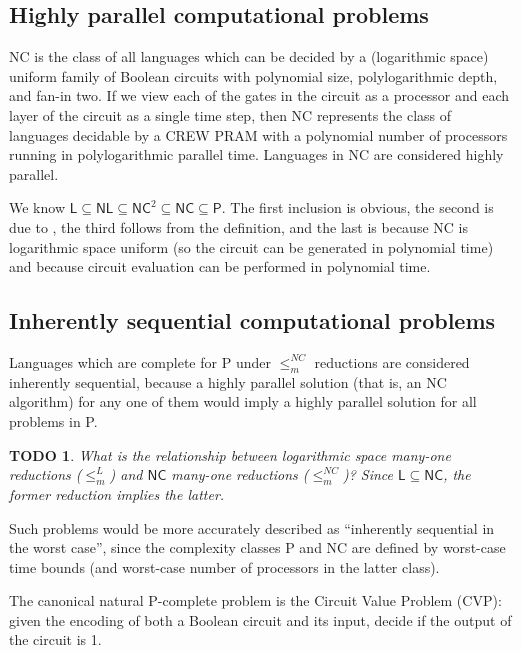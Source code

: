 \documentclass{article}
\newtheorem{todo}{TODO}
\begin{document}
\subsection{Highly parallel computational problems}\label{sec:definenc}

\textsf{NC}{} is the class of all languages which can be decided by a (logarithmic space) uniform family of Boolean circuits with polynomial size, polylogarithmic depth, and fan-in two.
If we view each of the gates in the circuit as a processor and each layer of the circuit as a single time step, then \textsf{NC} represents the class of languages decidable by a CREW PRAM with a polynomial number of processors running in polylogarithmic parallel time.
Languages in \textsf{NC} are considered highly parallel.

We know $\mathsf{L}\subseteq\mathsf{NL}\subseteq\mathsf{NC}^2\subseteq\mathsf{NC}\subseteq\mathsf{P}$.
The first inclusion is obvious, the second is due to \cite{borodin77}, the third follows from the definition, and the last is because \textsf{NC} is logarithmic space uniform (so the circuit can be generated in polynomial time) and because circuit evaluation can be performed in polynomial time.

\subsection{Inherently sequential computational problems}

Languages which are complete for \textsf{P} under $\leq_m^{NC}$ reductions are considered inherently sequential, because a highly parallel solution (that is, an \textsf{NC} algorithm) for any one of them would imply a highly parallel solution for all problems in \textsf{P}.
\begin{todo}
  What is the relationship between logarithmic space many-one reductions ($\leq_m^L$) and $\mathsf{NC}$ many-one reductions ($\leq_m^{NC}$)?
  Since $\mathsf{L}\subseteq\mathsf{NC}$, the former reduction implies the latter.
\end{todo}
Such problems would be more accurately described as ``inherently sequential in the worst case'', since the complexity classes \textsf{P} and \textsf{NC} are defined by worst-case time bounds (and worst-case number of processors in the latter class).

The canonical natural \textsf{P}-complete problem is the Circuit Value Problem (CVP): given the encoding of both a Boolean circuit and its input, decide if the output of the circuit is 1.
\end{document}
